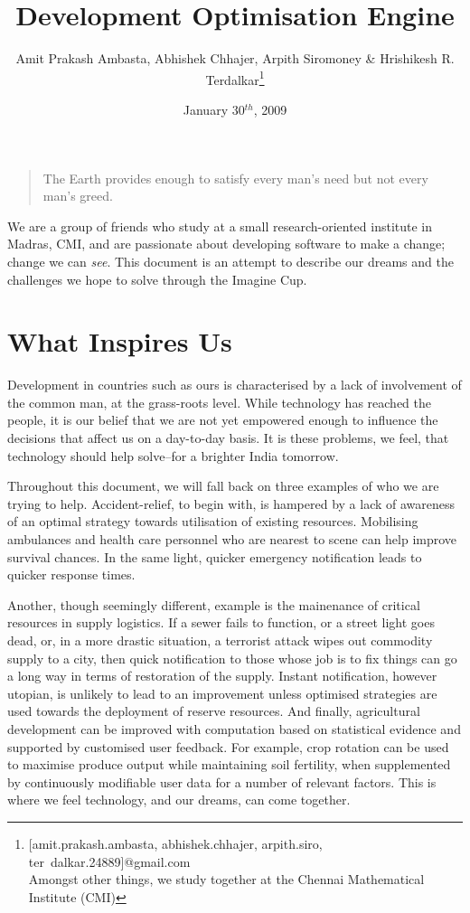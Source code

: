\documentclass{report}
\begin{document}
\title{Development Optimisation Engine}
\author{Amit Prakash Ambasta, Abhishek Chhajer, Arpith Siromoney \& Hrishikesh R. Terdalkar\footnote{[amit.prakash.ambasta, abhishek.chhajer, arpith.siro, ter\
dalkar.24889]@gmail.com\\Amongst other things, we study together at the Chennai Mathematical Institute (CMI)}}
\date{January 30$^{th}$, 2009}
\maketitle

\begin{quote}
The Earth provides enough to satisfy every man's need but not every man's greed.
\end{quote}

We are a group of friends who study at a small research-oriented institute in Madras, CMI, and are passionate about developing software to make a change; change we can \emph{see}.  This document is an attempt to describe our dreams and the challenges we hope to solve through the Imagine Cup.

\section*{What Inspires Us}
Development in countries such as ours is characterised by a lack of involvement of the common man, at the grass-roots level.  While technology has reached the people, it is our belief that we are not yet empowered enough to influence the decisions that affect us on a day-to-day basis.  It is these problems, we feel, that technology should help solve--for a brighter India tomorrow.

Throughout this document, we will fall back on three examples of who we are trying to help. Accident-relief, to begin with, is hampered by a lack of awareness of an optimal strategy towards utilisation of existing resources.  Mobilising ambulances and health care personnel who are nearest to scene can help improve survival chances.  In the same light, quicker emergency notification leads to quicker response times.

Another, though seemingly different, example is the mainenance of critical resources in supply logistics.  If a sewer fails to function, or a street light goes dead, or, in a more drastic situation, a terrorist attack wipes out commodity supply to a city, then quick notification to those whose job is to fix things can go a long way in terms of restoration of the supply.  Instant notification, however utopian, is unlikely to lead to an improvement unless optimised strategies are used towards the deployment of reserve resources.  And finally, agricultural development can be improved with computation based on statistical evidence and supported by customised user feedback.  For example, crop rotation can be used to maximise produce output while maintaining soil fertility, when supplemented by continuously modifiable user data for a number of relevant factors.  This is where we feel technology, and our dreams, can come together.
\end{document}

